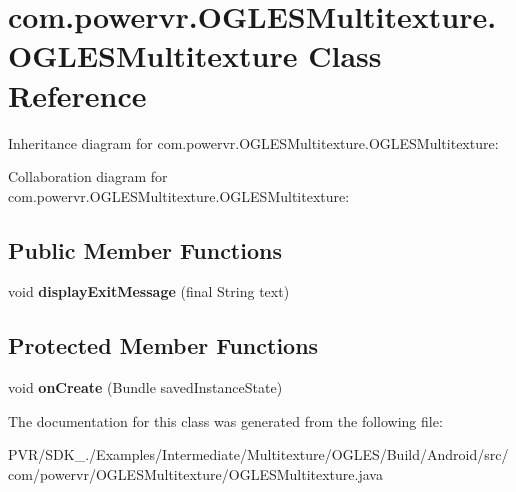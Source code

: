 \hypertarget{classcom_1_1powervr_1_1_o_g_l_e_s_multitexture_1_1_o_g_l_e_s_multitexture}{\section{com.\+powervr.\+O\+G\+L\+E\+S\+Multitexture.\+O\+G\+L\+E\+S\+Multitexture Class Reference}
\label{classcom_1_1powervr_1_1_o_g_l_e_s_multitexture_1_1_o_g_l_e_s_multitexture}
}


Inheritance diagram for com.\+powervr.\+O\+G\+L\+E\+S\+Multitexture.\+O\+G\+L\+E\+S\+Multitexture\+:


Collaboration diagram for com.\+powervr.\+O\+G\+L\+E\+S\+Multitexture.\+O\+G\+L\+E\+S\+Multitexture\+:
\subsection*{Public Member Functions}
\begin{DoxyCompactItemize}
\item 
\hypertarget{classcom_1_1powervr_1_1_o_g_l_e_s_multitexture_1_1_o_g_l_e_s_multitexture_acb98fbc6a8610838bff2013a13a85371}{void {\bfseries display\+Exit\+Message} (final String text)}\label{classcom_1_1powervr_1_1_o_g_l_e_s_multitexture_1_1_o_g_l_e_s_multitexture_acb98fbc6a8610838bff2013a13a85371}

\end{DoxyCompactItemize}
\subsection*{Protected Member Functions}
\begin{DoxyCompactItemize}
\item 
\hypertarget{classcom_1_1powervr_1_1_o_g_l_e_s_multitexture_1_1_o_g_l_e_s_multitexture_a0bab919992429d71b14828a1de7239b9}{void {\bfseries on\+Create} (Bundle saved\+Instance\+State)}\label{classcom_1_1powervr_1_1_o_g_l_e_s_multitexture_1_1_o_g_l_e_s_multitexture_a0bab919992429d71b14828a1de7239b9}

\end{DoxyCompactItemize}


The documentation for this class was generated from the following file\+:\begin{DoxyCompactItemize}
\item 
P\+V\+R/\+S\+D\+K\+\_./\+Examples/\+Intermediate/\+Multitexture/\+O\+G\+L\+E\+S/\+Build/\+Android/src/com/powervr/\+O\+G\+L\+E\+S\+Multitexture/O\+G\+L\+E\+S\+Multitexture.\+java\end{DoxyCompactItemize}
